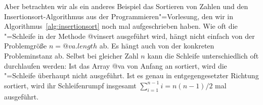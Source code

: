 Aber betrachten wir als ein anderes Beispiel das Sortieren von Zahlen
und \zB den Insertionsort-Algorithmus aus der
Programmieren"=Vorlesung, den wir in
Algorithmus~\ref{alg:insertionsort} noch mal aufgeschrieben haben. Wie
oft die "=Schleife in der Methode @v{insert} ausgeführt
wird, hängt nicht einfach von der Problemgröße $n=@v{a.length}$ ab. Es
hängt auch von der konkreten Probleminstanz ab. Selbst bei gleicher
Zahl $n$ kann die Schleife unterschiedlich oft durchlaufen werden: Ist
das Array @v{a} von Anfang an sortiert, wird die "=Schleife
überhaupt nicht ausgeführt. Ist es genau in entgegengesetzter Richtung
sortiert, wird ihr Schleifenrumpf insgesamt $\sum_{i=1}^{n-1}i =
n(n-1)/2$ mal ausgeführt.



